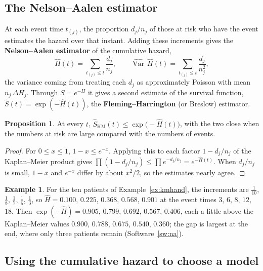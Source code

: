 \documentclass[11pt,a4paper]{article}
\numberwithin{equation}{section}
\theoremstyle{definition}
\newtheorem{exa}[thm]{Example}
\newtheorem{prop}[thm]{Proposition}
\begin{document}
\subsection{The Nelson--Aalen estimator}
\label{ssec:na}

At each event time $t_{(j)}$, the proportion $d_j/n_j$ of those at risk who have the event estimates the hazard over that instant. Adding these increments gives the \textbf{Nelson--Aalen estimator} of the cumulative hazard,
\[
\hat H(t) = \sum_{t_{(j)} \leq t}\frac{d_j}{n_j}, \qquad \widehat{\operatorname{Var}}\,\hat H(t) = \sum_{t_{(j)} \leq t}\frac{d_j}{n_j^2} ,
\]
the variance coming from treating each $d_j$ as approximately Poisson with mean $n_j\,\Delta H_j$. Through $S = e^{-H}$ it gives a second estimate of the survival function, $\tilde S(t) = \exp(-\hat H(t))$, the \textbf{Fleming--Harrington} (or Breslow) estimator.

\begin{prop}
\label{prop:kmna}
At every $t$, $\hat S_{\text{KM}}(t) \leq \exp\bigl(-\hat H(t)\bigr)$, with the two close when the numbers at risk are large compared with the numbers of events.
\end{prop}

\begin{proof}
For $0 \leq x \leq 1$, $1 - x \leq e^{-x}$. Applying this to each factor $1 - d_j/n_j$ of the Kaplan--Meier product gives $\prod(1 - d_j/n_j) \leq \prod e^{-d_j/n_j} = e^{-\hat H(t)}$. When $d_j/n_j$ is small, $1 - x$ and $e^{-x}$ differ by about $x^2/2$, so the estimates nearly agree.
\end{proof}

\begin{exa}
\label{ex:nahand}
For the ten patients of Example~\ref{ex:kmhand}, the increments are $\frac1{10}$, $\frac18$, $\frac17$, $\frac15$, $\frac13$, so $\hat H = 0.100$, $0.225$, $0.368$, $0.568$, $0.901$ at the event times $3$, $6$, $8$, $12$, $18$. Then $\exp(-\hat H) = 0.905$, $0.799$, $0.692$, $0.567$, $0.406$, each a little above the Kaplan--Meier values
$0.900$, $0.788$, $0.675$, $0.540$, $0.360$; the gap is largest at the end, where only three patients remain (Software~\ref{sw:na}).
\end{exa}

\subsection{Using the cumulative hazard to choose a model}
\label{ssec:hazardplots}
\end{document}
